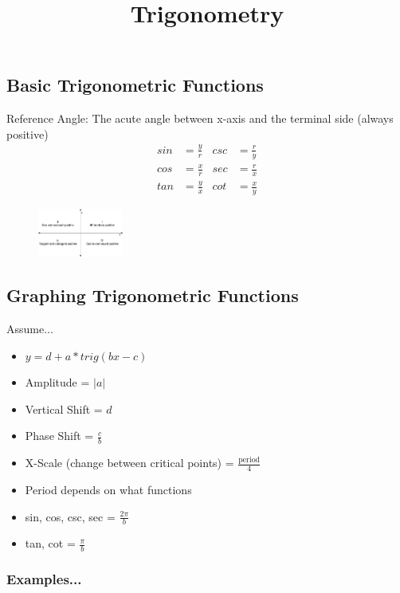 \documentclass[twocolumn]{article}
\title{\vspace{-5ex}Trigonometry \vspace{-5ex}}
\author{}
\date{}
\begin{document}
	\maketitle{}
	
	\subsection*{Basic Trigonometric Functions}
	Reference Angle: The acute angle between x-axis and the terminal side (always positive)
	\begin{align*}
		sin &= \frac{y}{r}  & csc &= \frac{r}{y} \\
		cos &= \frac{x}{r} & sec &= \frac{r}{x} \\
		tan &= \frac{y}{x} & cot &= \frac{x}{y}
	\end{align*}

	\begin{figure}[h]
		\centering
		\includegraphics[width=0.25\textwidth]{positive_quadrants.jpg}
	\end{figure}

	\subsection*{Graphing Trigonometric Functions}

	Assume...
	\begin{itemize}[label=--]
		\setlength\itemsep{-0.55em}
		\item $ y = d + a * trig(bx - c) $
		\item Amplitude = $ \vert a \vert $
		\item Vertical Shift = $d$
		\item Phase Shift = $ \frac{c}{b} $
		\item X-Scale (change between critical points) = $ \frac{\text{period}}{4} $
		\item Period depends on what functions
		\item sin, cos, csc, sec = $ \frac{2\pi}{b} $
		\item tan, cot = $ \frac{\pi}{b} $
	\end{itemize}
	
	\subsubsection*{Examples...}
\end{document}
